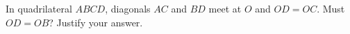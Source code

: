 In quadrilateral $ABCD$, diagonals $AC$ and $BD$ meet at $O$ and $OD=OC$. Must $OD=OB$? Justify your answer.
